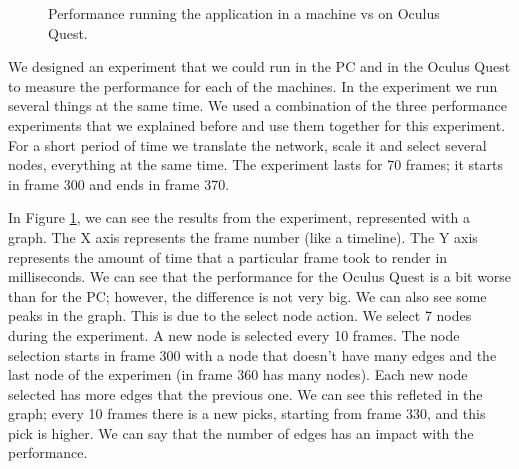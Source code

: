\begin{figure}[h!]
  \centering
  \begin{minipage}{.8\textwidth}
  \end{minipage}
\caption{Performance running the application in a machine vs on Oculus Quest.}
\label{fig:pc_vs_oculus}
\end{figure}

We designed an experiment that we could run in the PC and in the Oculus Quest to measure the performance for each of the machines. In the experiment we run several things at the same time. We used a combination of the three performance experiments that we explained before and use them together for this experiment. For a short period of time we translate the network, scale it and select several nodes, everything at the same time. The experiment lasts for 70 frames; it starts in frame 300 and ends in frame 370.

In Figure \ref{fig:pc_vs_oculus}, we can see the results from the experiment, represented with a graph. The X axis represents the frame number (like a timeline). The Y axis represents the amount of time that a particular frame took to render in milliseconds. We can see that the performance for the Oculus Quest is a bit worse than for the PC; however, the difference is not very big. We can also see some peaks in the graph. This is due to the select node action. We select 7 nodes during the experiment. A new node is selected every 10 frames. The node selection starts in frame 300 with a node that doesn't have many edges and the last node of the experimen (in frame 360 has many nodes). Each new node selected has more edges that the previous one. We can see this refleted in the graph; every 10 frames there is a new picks, starting from frame 330, and this pick is higher. We can say that the number of edges has an impact with the performance.

